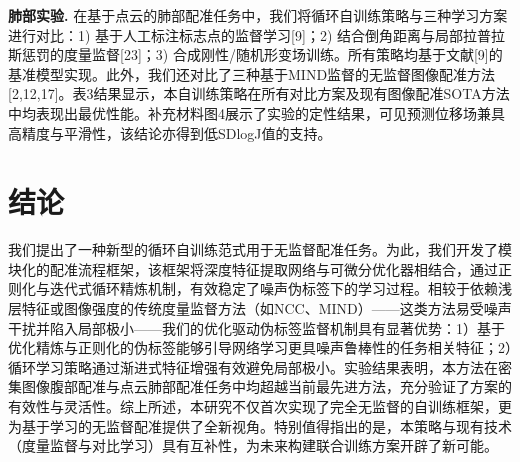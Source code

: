 \textbf{肺部实验.} 在基于点云的肺部配准任务中，我们将循环自训练策略与三种学习方案进行对比：1) 基于人工标注标志点的监督学习[9]；2) 结合倒角距离与局部拉普拉斯惩罚的度量监督[23]；3) 合成刚性/随机形变场训练。所有策略均基于文献[9]的基准模型实现。此外，我们还对比了三种基于MIND监督的无监督图像配准方法[2,12,17]。表3结果显示，本自训练策略在所有对比方案及现有图像配准SOTA方法中均表现出最优性能。补充材料图4展示了实验的定性结果，可见预测位移场兼具高精度与平滑性，该结论亦得到低SDlogJ值的支持。

\section{结论}

我们提出了一种新型的循环自训练范式用于无监督配准任务。为此，我们开发了模块化的配准流程框架，该框架将深度特征提取网络与可微分优化器相结合，通过正则化与迭代式循环精炼机制，有效稳定了噪声伪标签下的学习过程。相较于依赖浅层特征或图像强度的传统度量监督方法（如NCC、MIND）——这类方法易受噪声干扰并陷入局部极小——我们的优化驱动伪标签监督机制具有显著优势：1）基于优化精炼与正则化的伪标签能够引导网络学习更具噪声鲁棒性的任务相关特征；2）循环学习策略通过渐进式特征增强有效避免局部极小。实验结果表明，本方法在密集图像腹部配准与点云肺部配准任务中均超越当前最先进方法，充分验证了方案的有效性与灵活性。综上所述，本研究不仅首次实现了完全无监督的自训练框架，更为基于学习的无监督配准提供了全新视角。特别值得指出的是，本策略与现有技术（度量监督与对比学习）具有互补性，为未来构建联合训练方案开辟了新可能。





